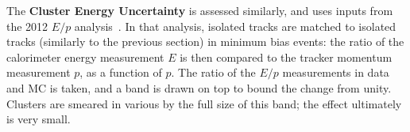 	The \textbf{Cluster Energy Uncertainty} is assessed similarly, and uses inputs from the 2012 $E/p$ analysis~. In that analysis, isolated tracks are matched to isolated tracks (similarly to the previous section) in minimum bias events: the ratio of the calorimeter energy measurement $E$ is then compared to the tracker momentum measurement $p$, as a function of $p$. The ratio of the $E/p$ measurements in data and MC is taken, and a band is drawn on top to bound the change from unity. 	Clusters are smeared in various by the full size of this band; the effect ultimately is very small.










